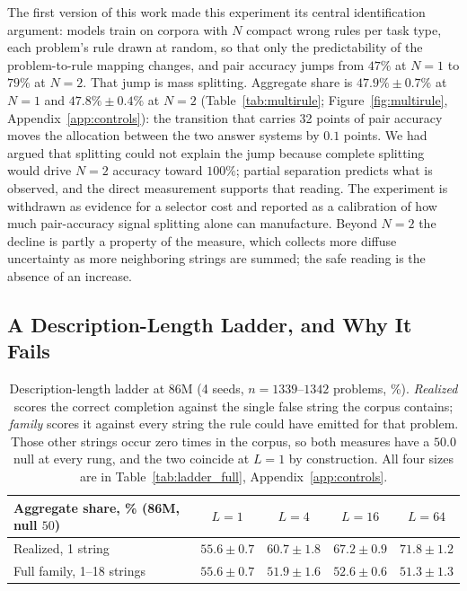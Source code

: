 \documentclass{article}
\begin{document}
The first version of this work made this experiment its central identification argument: models train on corpora with $N$ compact wrong rules per task type, each problem's rule drawn at random, so that only the predictability of the problem-to-rule mapping changes, and pair accuracy jumps from $47\%$ at $N{=}1$ to $79\%$ at $N{=}2$. That jump is mass splitting. Aggregate share is $47.9\% \pm 0.7\%$ at $N{=}1$ and $47.8\% \pm 0.4\%$ at $N{=}2$ (Table~\ref{tab:multirule}; Figure~\ref{fig:multirule}, Appendix~\ref{app:controls}): the transition that carries 32 points of pair accuracy moves the allocation between the two answer systems by $0.1$ points. We had argued that splitting could not explain the jump because complete splitting would drive $N{=}2$ accuracy toward $100\%$; partial separation predicts what is observed, and the direct measurement supports that reading. The experiment is withdrawn as evidence for a selector cost and reported as a calibration of how much pair-accuracy signal splitting alone can manufacture. Beyond $N{=}2$ the decline is partly a property of the measure, which collects more diffuse uncertainty as more neighboring strings are summed; the safe reading is the absence of an increase.

\subsection{A Description-Length Ladder, and Why It Fails}
\label{sec:ladder}

\begin{table}[t]
\centering
\small
\begin{tabular}{lcccc}
\toprule
Aggregate share, \% (86M, null $50$) & $L{=}1$ & $L{=}4$ & $L{=}16$ & $L{=}64$ \\
\midrule
Realized, 1 string & $55.6 \pm 0.7$ & $60.7 \pm 1.8$ & $67.2 \pm 0.9$ & $71.8 \pm 1.2$ \\
Full family, 1--18 strings & $55.6 \pm 0.7$ & $51.9 \pm 1.6$ & $52.6 \pm 0.6$ & $51.3 \pm 1.3$ \\
\bottomrule
\end{tabular}
\caption{Description-length ladder at 86M (4 seeds, $n{=}1339$--$1342$ problems, \%). \emph{Realized} scores the correct completion against the single false string the corpus contains; \emph{family} scores it against every string the rule could have emitted for that problem. Those other strings occur zero times in the corpus, so both measures have a $50.0$ null at every rung, and the two coincide at $L{=}1$ by construction. All four sizes are in Table~\ref{tab:ladder_full}, Appendix~\ref{app:controls}.}
\label{tab:ladder}
\end{table}
\end{document}
